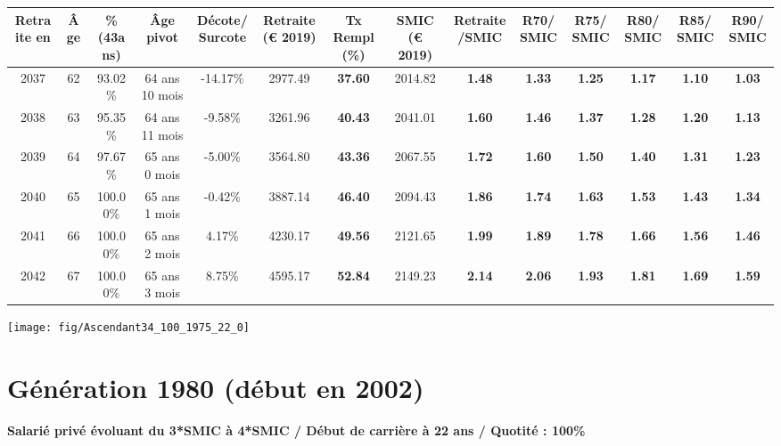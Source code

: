 \begin{adjustbox}{max width=\textwidth} 
\begin{tabular}[htb]{|c|c||c|c|c||c|c||c|c||c|c|c|c|c|} 
\hline 
 Retraite en &  Âge &  \%(43ans) &  Âge pivot &  Décote/Surcote &  Retraite (\euro{} 2019) &  Tx Rempl(\%) &  SMIC (\euro{} 2019) &  Retraite/SMIC &  R70/SMIC &  R75/SMIC &  R80/SMIC &  R85/SMIC &  R90/SMIC \\ 
\hline \hline 
 2037 &  62 &  93.02\% &  64 ans 10 mois &  -14.17\% &  2977.49 &  {\bf 37.60} &  2014.82 &  {\bf 1.48} &  {\bf 1.33} &  {\bf 1.25} &  {\bf 1.17} &  {\bf 1.10} &  {\bf 1.03} \\ 
\hline 
 2038 &  63 &  95.35\% &  64 ans 11 mois &  -9.58\% &  3261.96 &  {\bf 40.43} &  2041.01 &  {\bf 1.60} &  {\bf 1.46} &  {\bf 1.37} &  {\bf 1.28} &  {\bf 1.20} &  {\bf 1.13} \\ 
\hline 
 2039 &  64 &  97.67\% &  65 ans 0 mois &  -5.00\% &  3564.80 &  {\bf 43.36} &  2067.55 &  {\bf 1.72} &  {\bf 1.60} &  {\bf 1.50} &  {\bf 1.40} &  {\bf 1.31} &  {\bf 1.23} \\ 
\hline 
 2040 &  65 &  100.00\% &  65 ans 1 mois &  -0.42\% &  3887.14 &  {\bf 46.40} &  2094.43 &  {\bf 1.86} &  {\bf 1.74} &  {\bf 1.63} &  {\bf 1.53} &  {\bf 1.43} &  {\bf 1.34} \\ 
\hline 
 2041 &  66 &  100.00\% &  65 ans 2 mois &  4.17\% &  4230.17 &  {\bf 49.56} &  2121.65 &  {\bf 1.99} &  {\bf 1.89} &  {\bf 1.78} &  {\bf 1.66} &  {\bf 1.56} &  {\bf 1.46} \\ 
\hline 
 2042 &  67 &  100.00\% &  65 ans 3 mois &  8.75\% &  4595.17 &  {\bf 52.84} &  2149.23 &  {\bf 2.14} &  {\bf 2.06} &  {\bf 1.93} &  {\bf 1.81} &  {\bf 1.69} &  {\bf 1.59} \\ 
\hline 
\hline 
\end{tabular} 
\end{adjustbox} 
 
 \vspace{0.1cm} 

 {\hspace{-2.2cm}\texttt{[image: fig/Ascendant34\_100\_1975\_22\_0]}} 

\newpage 
 
\section{Génération 1980 (début en 2002)\label{Ascendant34_100_1980_22_0}} 
 
{\bf \noindent Salarié privé évoluant du 3*SMIC à 4*SMIC / Début de carrière à 22 ans / Quotité : 100\%}  ~ 

